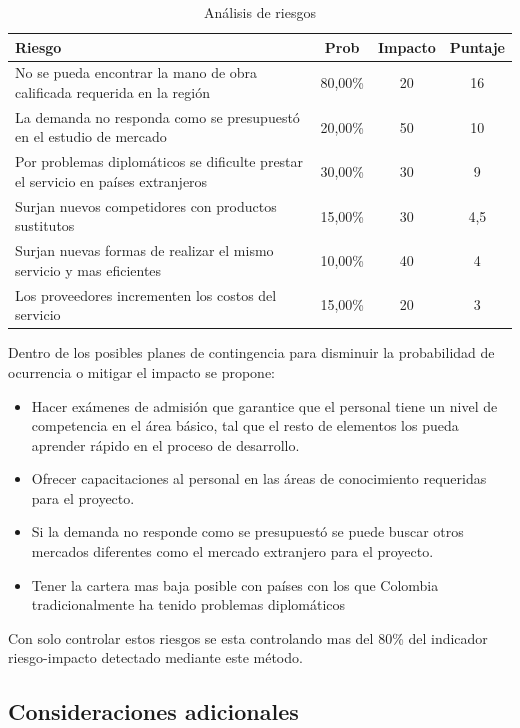 \documentclass[a4paper, 12pt, oneside]{article}
\begin{document}
	\begin{table}
		\caption{Análisis de riesgos}
		\centering
		\begin{tabular}{ |p{6cm}|c|c|c| }
		\hline
		Riesgo & Prob & Impacto & Puntaje \\
		\hline
		No se pueda encontrar la mano de obra calificada requerida en la región & 80,00\% & 20 & 16 \\
		\hline
		La demanda no responda como se presupuestó en el estudio de mercado & 20,00\% & 50 & 10 \\
		\hline
		Por problemas diplomáticos se dificulte prestar el servicio en países extranjeros & 30,00\% & 30 & 9 \\
		\hline
		Surjan nuevos competidores con productos sustitutos & 15,00\% & 30 & 4,5 \\
		\hline
		Surjan nuevas formas de realizar el mismo servicio y mas eficientes & 10,00\% & 40 & 4 \\
		\hline
		Los proveedores incrementen los costos del servicio & 15,00\% & 20 & 3 \\
		\hline
		\end{tabular}		
		\label{tb:riesgos}
	\end{table}
	
	Dentro de los posibles planes de contingencia para disminuir la probabilidad de ocurrencia o mitigar el impacto se propone:
	\begin{itemize}
	\item Hacer exámenes de admisión que garantice que el personal tiene un nivel de competencia en el área básico, tal que el resto de elementos los pueda aprender rápido en el proceso de desarrollo.
	\item Ofrecer capacitaciones al personal en las áreas de conocimiento requeridas para el proyecto.
	\item Si la demanda no responde como se presupuestó se puede buscar otros mercados diferentes como el mercado extranjero para el proyecto.
	\item Tener la cartera mas baja posible	con países con los que Colombia tradicionalmente ha tenido problemas diplomáticos
	\end{itemize}
	Con solo controlar estos riesgos se esta controlando mas del 80\% del indicador riesgo-impacto detectado mediante este método.
	
	\clearpage
	
	\begin{center}
	\section{Consideraciones adicionales}
	\end{center}
\end{document}
